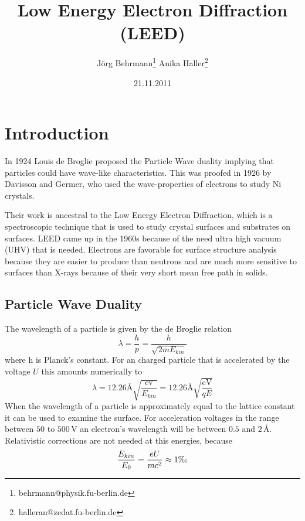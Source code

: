 \documentclass[a4paper,10pt]{scrartcl}
\begin{document}
\title{Low Energy Electron Diffraction (LEED)}
\author{J\"org Behrmann\footnote{behrmann@physik.fu-berlin.de} \qquad Anika Haller\footnote{halleran@zedat.fu-berlin.de}}
\date{21.11.2011}
\maketitle
\tableofcontents
\thispagestyle{empty}

\section{Introduction}

In 1924 Louis de Broglie proposed the Particle Wave duality implying that particles could have wave-like characteristics. This was proofed in 1926 by Davisson and Germer, who used the wave-properties of electrons to study Ni crystals. 

Their work is ancestral to the Low Energy Electron Diffraction, which is a spectroscopic technique that is used to study crystal surfaces and substrates on surfaces. LEED came up in the 1960s because of the need ultra high vacuum (UHV) that is needed. Electrons are favorable for surface structure analysis because they are easier to produce than neutrons and are much more sensitive to surfaces than X-rays because of their very short mean free path in solids.

\subsection{Particle Wave Duality}

The wavelength of a particle is given by the de Broglie relation
\begin{equation}
\lambda = \frac{h}{p} = \frac{h}{\sqrt{2mE_{kin}}} \label{eq:broglie1}
\end{equation}
where h is Planck's constant. For an charged particle that is accelerated by the voltage $U$ this amounts numerically to
\begin{equation}
\lambda = 12.26 \mbox{\AA} \sqrt{\frac{\mbox{ev}}{E_{kin}}} = 12.26 \mbox{\AA} \sqrt{\frac{\mbox{eV}}{qE}} \label{eq:broglie}
\end{equation}
When the wavelength of a particle is approximately equal to the lattice constant it can be used to examine the surface. For acceleration voltages in the range between $50$ to $500\,$V an electron's wavelength will be between $0.5$ and $2\,$\AA. Relativistic corrections are not needed at this energies, because 
\begin{equation}
\frac{E_{kin}}{E_0}=\frac{eU}{mc^2} \approx 1\mbox{\textperthousand}
\end{equation}
\end{document}
